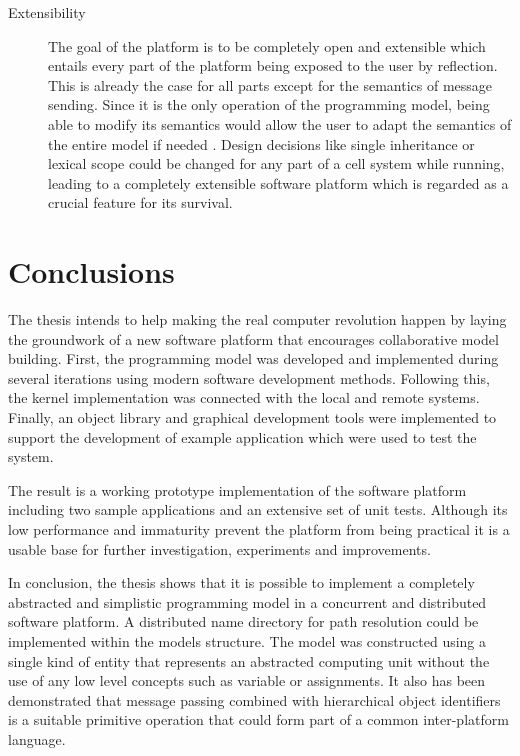 \begin{description}
\item[Extensibility]

The goal of the platform is to be completely open and extensible which entails every part of the platform being exposed to the user by reflection. This is already the case for all parts except for the semantics of message sending. Since it is the only operation of the programming model, being able to modify its semantics would allow the user to adapt the semantics of the entire model if needed \cite{OpenObjects}. Design decisions like single inheritance or lexical scope could be changed for any part of a cell system while running, leading to a completely extensible software platform which is regarded as a crucial feature for its survival.

\end{description}

\section{Conclusions}

The thesis intends to help making the real computer revolution happen by laying the groundwork of a new software platform that encourages collaborative model building. First, the programming model was developed and implemented during several iterations using modern software development methods. Following this, the kernel implementation was connected with the local and remote systems. Finally, an object library and graphical development tools were implemented to support the development of example application which were used to test the system.

The result is a working prototype implementation of the software platform including two sample applications and an extensive set of unit tests. Although its low performance and immaturity prevent the platform from being practical it is a usable base for further investigation, experiments and improvements.

In conclusion, the thesis shows that it is possible to implement a completely abstracted and simplistic programming model in a concurrent and distributed software platform. A distributed name directory for path resolution could be implemented within the models structure. The model was constructed using a single kind of entity that represents an abstracted computing unit without the use of any low level concepts such as variable or assignments. It also has been demonstrated that message passing combined with hierarchical object identifiers is a suitable primitive operation that could form part of a common inter-platform language.











